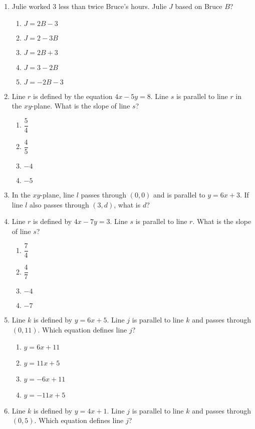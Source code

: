 \documentclass[12pt]{exam}
\begin{document}
\begin{enumerate}
    \item Julie worked 3 less than twice Bruce's hours. Julie $J$ based on Bruce $B$?
    \begin{enumerate}[label=\Alph*)]
        \item $J = 2B - 3$
        \item $J = 2 - 3B$
        \item $J = 2B + 3$
        \item $J = 3 - 2B$
        \item $J = -2B - 3$
    \end{enumerate}
    \item Line $r$ is defined by the equation $4x - 5y = 8$. Line $s$ is parallel to line $r$ in the $xy$-plane. What is the slope of line $s$?
    \begin{enumerate}[label=\Alph*)]
        \item $\dfrac{5}{4}$
        \item $\dfrac{4}{5}$
        \item $-4$
        \item $-5$
    \end{enumerate}
    \item In the $xy$-plane, line $l$ passes through $(0,0)$ and is parallel to $y = 6x + 3$. If line $l$ also passes through $(3,d)$, what is $d$?
    \item Line $r$ is defined by $4x - 7y = 3$. Line $s$ is parallel to line $r$. What is the slope of line $s$?
    \begin{enumerate}[label=\Alph*)]
        \item $\dfrac{7}{4}$
        \item $\dfrac{4}{7}$
        \item $-4$
        \item $-7$
    \end{enumerate}
    \item Line $k$ is defined by $y = 6x + 5$. Line $j$ is parallel to line $k$ and passes through $(0,11)$. Which equation defines line $j$?
    \begin{enumerate}[label=\Alph*)]
        \item $y = 6x + 11$
        \item $y = 11x + 5$
        \item $y = -6x + 11$
        \item $y = -11x + 5$
    \end{enumerate}
    \item Line $k$ is defined by $y = 4x + 1$. Line $j$ is parallel to line $k$ and passes through $(0,5)$. Which equation defines line $j$?

\end{enumerate}
\end{document}
